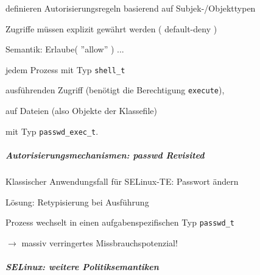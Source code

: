 \documentclass[a4paper]{article}
\begin{document}
\begin{multicols}{3}
    \begin{itemize*}
        \item
        definieren Autorisierungsregeln basierend auf Subjek-/Objekttypen
        \item
        Zugriffe müssen explizit gewährt werden ( default-deny )

        \item
        Semantik: Erlaube( ''allow'' ) ...
        \begin{itemize*}
            \item jedem Prozess mit Typ \texttt{shell\_t}
            \item ausführenden Zugriff (benötigt die Berechtigung \texttt{execute}),
            \item auf Dateien (also Objekte der Klassefile)
            \item mit Typ \texttt{passwd\_exec\_t}.
        \end{itemize*}
    \end{itemize*}


    \subparagraph{Autorisierungsmechanismen: passwd
        Revisited}

    Klassischer Anwendungsfall für SELinux-TE: Passwort ändern

    Lösung: Retypisierung bei Ausführung

    \begin{itemize*}
        \item
        Prozess wechselt in einen aufgabenspezifischen Typ \texttt{passwd\_t}
        \item
        $\rightarrow$ massiv verringertes
        Missbrauchspotenzial!
        \item
    \end{itemize*}


    \subparagraph{SELinux: weitere
        Politiksemantiken}


\end{multicols}
\end{document}
